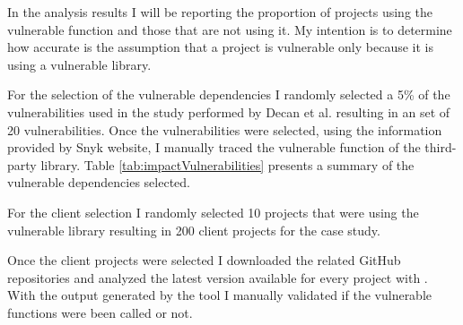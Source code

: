 In the analysis results I will be reporting the proportion of projects using the vulnerable function and those that are not using it. My intention is to determine how accurate is the assumption that a project is vulnerable only because it is using a vulnerable library.

For the selection of the vulnerable dependencies I randomly selected a 5\% of the vulnerabilities used in the study performed by Decan et al. \cite{decan2018impact} resulting in an set of 20 vulnerabilities. 
Once the vulnerabilities were selected, using the information provided by Snyk website, I manually traced the vulnerable function of the third-party library. Table \ref{tab:impactVulnerabilities} presents a summary of the vulnerable dependencies selected.

For the client selection I randomly selected 10 projects that were using the vulnerable library resulting in 200 client projects for the case study. 

Once the client projects were selected I downloaded the related GitHub repositories and analyzed the latest version available for every project with \tool[]. With the output generated by the tool I manually validated if the vulnerable functions were been called or not.

